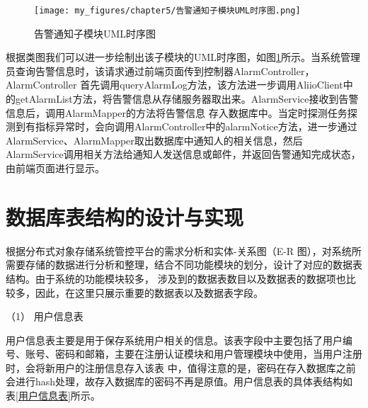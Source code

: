 \begin{figure}[htb]
    \centering
    \texttt{[image: my\_figures/chapter5/告警通知子模块UML时序图.png]}
    \caption{告警通知子模块UML时序图}
    \label{fig:告警通知子模块UML时序图}
\end{figure}

根据类图我们可以进一步绘制出该子模块的UML时序图，如图\ref{fig:告警通知子模块UML时序图}所示。当系统管理员查询告警信息时，该请求通过前端页面传到控制器AlarmController，AlarmController
首先调用queryAlarmLog方法，该方法进一步调用AliioClient中的getAlarmList方法，将告警信息从存储服务器取出来。AlarmService接收到告警信息后，调用AlarmMapper的方法将告警信息
存入数据库中。当定时探测任务探测到有指标异常时，会向调用AlarmController中的alarmNotice方法，进一步通过AlarmService、AlarmMapper取出数据库中通知人的相关信息，然后
AlarmService调用相关方法给通知人发送信息或邮件，并返回告警通知完成状态，由前端页面进行显示。


\section{数据库表结构的设计与实现}


根据分布式对象存储系统管控平台的需求分析和实体-关系图（E-R 图），对系统所需要存储的数据进行分析和整理，结合不同功能模块的划分，设计了对应的数据表结构。由于系统的功能模块较多，
涉及到的数据表数目以及数据表的数据项也比较多，因此，在这里只展示重要的数据表以及数据表字段。


（1） 用户信息表

用户信息表主要是用于保存系统用户相关的信息。该表字段中主要包括了用户编号、账号、密码和邮箱，主要在注册认证模块和用户管理模块中使用，当用户注册时，会将新用户的注册信息存入该表
中，值得注意的是，密码在存入数据库之前会进行hash处理，故存入数据库的密码不再是原值。用户信息表的具体表结构如表\ref{用户信息表}所示。

